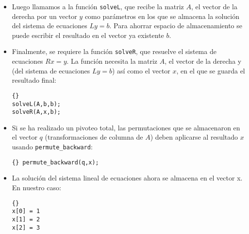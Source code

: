 \begin{itemize}
\item Luego llamamos a la función \lstinline{solveL}, que recibe la matriz $A$, 
el vector de la derecha por un vector $y$ como parámetros en los que 
se almacena la solución del sistema de ecuaciones $Ly = b$. 
Para ahorrar espacio de almacenamiento se puede 
escribir el resultado en el vector ya existente $b$.

\item Finalmente, se requiere la función \lstinline{solveR}, que resuelve el 
sistema de ecuaciones $Rx = y$. La función necesita la matriz $A$, el vector de la 
derecha y (del sistema de ecuaciones $Ly = b$) así como el vector $x$, 
en el que se guarda el resultado final:

  {\footnotesize{\begin{lstlisting}{}
solveL(A,b,b);
solveR(A,x,b);
\end{lstlisting}}}

\item Si se ha realizado un pivoteo total, las permutaciones que se almacenaron
 en el vector $q$ (transformaciones de columna de $A$) deben aplicarse al resultado
 $x$ usando \lstinline{permute_backward}:

  {\footnotesize{\begin{lstlisting}{} permute_backward(q,x);
\end{lstlisting}}}

\item La solución del sistema lineal de ecuaciones ahora se almacena en el vector x. 
En nuestro caso:
    {\footnotesize{\begin{lstlisting}{}
x[0] = 1
x[1] = 2
x[2] = 3
\end{lstlisting}}}
  \end{itemize}



